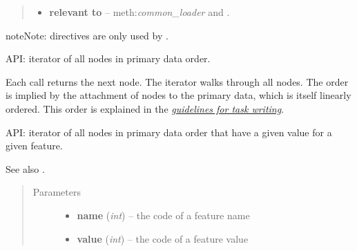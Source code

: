 \documentclass[letterpaper,10pt,english]{sphinxmanual}
\begin{document}
\begin{fulllineitems}
\begin{fulllineitems}
\begin{quote}
\begin{description}
\begin{itemize}
\item {} 
\textbf{relevant to} --
meth:\emph{common\_loader} and {\hyperref[graf/graf:graf.task.GrafTask.feature_loader]{}}.

\end{itemize}

\end{description}\end{quote}

\begin{notice}{note}{Note:}
directives are only used by {\hyperref[graf/graf:graf.task.GrafTask.feature_loader]{}}.
\end{notice}

\end{fulllineitems}


\begin{fulllineitems}
\label{graf/graf:graf.task.GrafTask.next_node}
API: iterator of all nodes in primary data order.

Each call returns the next node. The iterator walks through all nodes.
The order is implied by the attachment of nodes to the primary data,
which is itself linearly ordered.
This order is explained in the {\hyperref[taskwriting:node-order]{\emph{guidelines for task writing}}}.

\end{fulllineitems}


\begin{fulllineitems}
\label{graf/graf:graf.task.GrafTask.next_node_with_fval}
API: iterator of all nodes in primary data order that have a
given value for a given feature.

See also {\hyperref[graf/graf:graf.task.GrafTask.next_node]{}}.
\begin{quote}\begin{description}
\item[{Parameters}] \leavevmode\begin{itemize}
\item {} 
\textbf{name} (\emph{int}) --
the code of a feature name

\item {} 
\textbf{value} (\emph{int}) --
the code of a feature value


\end{itemize}
\end{description}
\end{quote}
\end{fulllineitems}
\end{fulllineitems}
\end{document}

